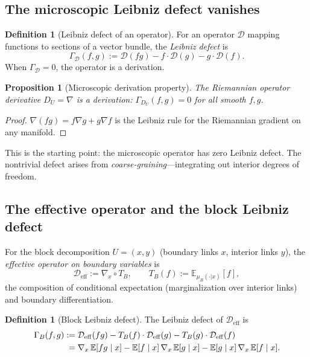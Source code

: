 \documentclass[11pt,a4paper]{article}
\theoremstyle{plain}
\newtheorem{proposition}[theorem]{Proposition}
\theoremstyle{definition}
\newtheorem{definition}[theorem]{Definition}
\theoremstyle{remark}
\newcommand{\E}{\mathbb{E}}
\begin{document}
\subsection{The microscopic Leibniz defect vanishes}

\begin{definition}[Leibniz defect of an operator]\label{def:leibniz}
For an operator $\mathcal{D}$ mapping functions to sections of a
vector bundle, the \emph{Leibniz defect} is
\begin{equation}\label{eq:leibniz-abstract}
\Gamma_{\mathcal{D}}(f,g)
:= \mathcal{D}(fg) - f \cdot \mathcal{D}(g) - g \cdot \mathcal{D}(f).
\end{equation}
When $\Gamma_{\mathcal{D}} = 0$, the operator is a derivation.
\end{definition}

\begin{proposition}[Microscopic derivation property]\label{prop:micro-deriv}
The Riemannian operator derivative $D_U = \nabla$ is a derivation:
$\Gamma_{D_U}(f,g) = 0$ for all smooth $f, g$.
\end{proposition}

\begin{proof}
$\nabla(fg) = f\nabla g + g\nabla f$ is the Leibniz rule for the
Riemannian gradient on any manifold.
\end{proof}

This is the starting point: the microscopic operator has zero
Leibniz defect. The nontrivial defect arises from
\emph{coarse-graining}---integrating out interior degrees of freedom.


\subsection{The effective operator and the block Leibniz defect}

For the block decomposition $U = (x, y)$ (boundary links $x$,
interior links $y$), the \emph{effective operator on boundary
variables} is
\begin{equation}\label{eq:effective-D}
\mathcal{D}_{\mathrm{eff}} := \nabla_x \circ T_B,
\qquad T_B(f) := \E_{\mu_B(\cdot|x)}[f],
\end{equation}
the composition of conditional expectation (marginalization over
interior links) and boundary differentiation.

\begin{definition}[Block Leibniz defect]\label{def:block-leibniz}
The Leibniz defect of $\mathcal{D}_{\mathrm{eff}}$ is
\begin{align}\label{eq:block-leibniz}
\Gamma_B(f,g) &:= \mathcal{D}_{\mathrm{eff}}(fg)
- T_B(f) \cdot \mathcal{D}_{\mathrm{eff}}(g)
- T_B(g) \cdot \mathcal{D}_{\mathrm{eff}}(f) \\
&\;= \nabla_x\,\E[fg \mid x]
- \E[f \mid x]\,\nabla_x\,\E[g \mid x]
- \E[g \mid x]\,\nabla_x\,\E[f \mid x]. \notag
\end{align}
\end{definition}
\end{document}
